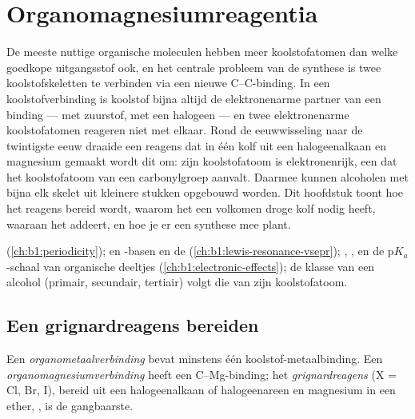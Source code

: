 \chapter{Organomagnesiumreagentia}\label{ch:b1:organomagnesium}

De meeste nuttige organische moleculen hebben meer koolstofatomen dan
welke goedkope uitgangsstof ook, en het centrale probleem van de synthese
is twee koolstofskeletten te verbinden via een nieuwe C--C-binding. In
een koolstofverbinding is koolstof bijna altijd de elektronenarme partner
van een binding --- met zuurstof, met een halogeen --- en twee
elektronenarme koolstofatomen reageren niet met elkaar. Rond de
eeuwwisseling naar de twintigste eeuw draaide een reagens dat in één kolf
uit een halogeenalkaan en magnesium gemaakt wordt dit om: zijn
koolstofatoom is elektronenrijk, een  dat het koolstofatoom van
een carbonylgroep aanvalt. Daarmee kunnen alcoholen met bijna elk skelet
uit kleinere stukken opgebouwd worden. Dit hoofdstuk toont hoe het
reagens bereid wordt, waarom het een volkomen droge kolf nodig heeft,
waaraan het addeert, en hoe je er een synthese mee plant.

\begin{recall}
 (\cref{ch:b1:periodicity});  en -basen en
de  (\cref{ch:b1:lewis-resonance-vsepr}); ,
,  en de $\mathrm{p}K_a$-schaal van organische
deeltjes (\cref{ch:b1:electronic-effects}); de klasse van een alcohol
(primair, secundair, tertiair) volgt die van zijn koolstofatoom.
\end{recall}

\section{Een grignardreagens bereiden}

\begin{definition}\label{def:b1:organomagnesium:organometallic}
Een \emph{organometaalverbinding} bevat
minstens één koolstof-metaalbinding. Een
\emph{organomagnesiumverbinding} heeft
een C--Mg-binding; het \emph{grignardreagens}
 (X = Cl, Br, I), bereid uit een halogeenalkaan of halogeenareen
en magnesium in een ether, , is de gangbaarste.
\end{definition}

